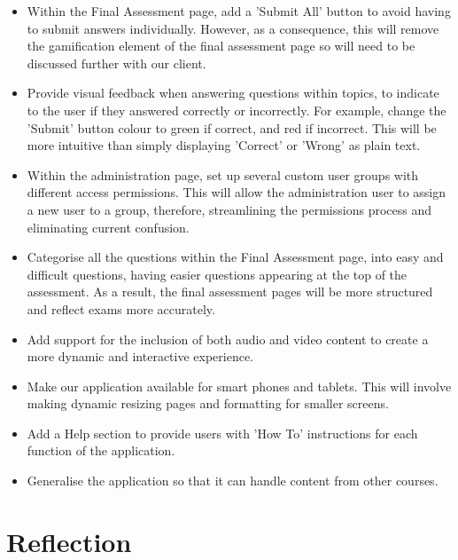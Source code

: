 \documentclass{l3proj}
\begin{document}
{\begin{itemize}
\item Within the Final Assessment page, add a 'Submit All' button to avoid having to submit answers individually. However, as a consequence, this will remove the gamification element of the final assessment page so will need to be discussed further with our client.
\item Provide visual feedback when answering questions within topics, to indicate to the user if they answered correctly or incorrectly. For example, change the 'Submit' button colour to green if correct, and red if incorrect. This will be more intuitive than simply displaying 'Correct' or 'Wrong' as plain text.
\item Within the administration page, set up several custom user groups with different access permissions. This will allow the administration user to assign a new user to a group, therefore, streamlining the permissions process and eliminating current confusion.
\item Categorise all the questions within the Final Assessment page, into easy and difficult questions, having easier questions appearing at the top of the assessment. As a result, the final assessment pages will be more structured and reflect exams more accurately.
\item Add support for the inclusion of both audio and video content to create a more dynamic and interactive experience.
\item Make our application available for smart phones and tablets. This will involve making dynamic resizing pages and formatting for smaller screens.
\item Add a Help section to provide users with 'How To' instructions for each function of the application.
\item Generalise the application so that it can handle content from other courses. 
\end{itemize}

\section{Reflection}



}
\end{document}
